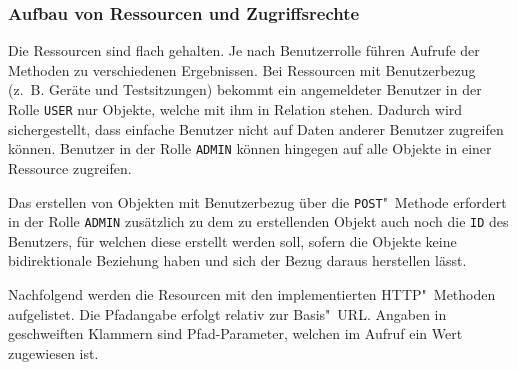 \subsubsection{Aufbau von Ressourcen und Zugriffsrechte}
Die Ressourcen sind flach gehalten.
Je nach Benutzerrolle führen Aufrufe der Methoden zu verschiedenen Ergebnissen.
Bei Ressourcen mit Benutzerbezug (z.~B. Geräte und Testsitzungen) bekommt ein angemeldeter Benutzer in der Rolle \texttt{USER} nur Objekte, welche mit ihm in Relation stehen.
Dadurch wird sichergestellt, dass einfache Benutzer nicht auf Daten anderer Benutzer zugreifen können.
Benutzer in der Rolle \texttt{ADMIN} können hingegen auf alle Objekte in einer Ressource zugreifen.

Das erstellen von Objekten mit Benutzerbezug über die \texttt{POST}"~Methode erfordert in der Rolle \texttt{ADMIN} zusätzlich zu dem zu erstellenden Objekt auch noch die \texttt{ID} des Benutzers, für welchen diese erstellt werden soll, sofern die Objekte keine bidirektionale Beziehung haben und sich der Bezug daraus herstellen lässt. 

Nachfolgend werden die Resourcen mit den implementierten \ac{HTTP}"~Methoden aufgelistet.
Die Pfadangabe erfolgt relativ zur Basis"~\ac{URL}.
Angaben in geschweiften Klammern sind Pfad-Parameter, welchen im Aufruf ein Wert zugewiesen ist.

